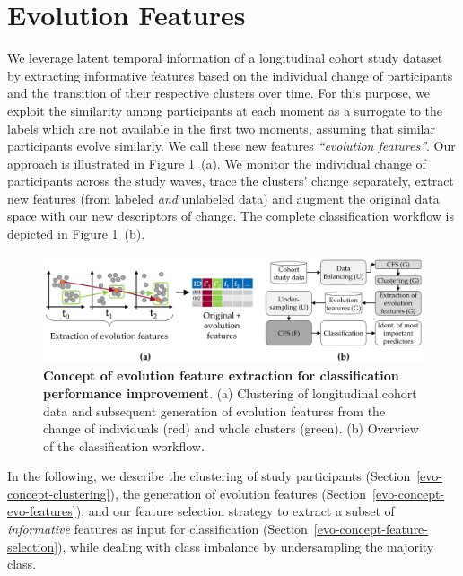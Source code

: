 \documentclass[
  oneside]{book}
\begin{document}
\hypertarget{evo-concept}{%
\section{Evolution Features}\label{evo-concept}}

We leverage latent temporal information of a longitudinal cohort study dataset by extracting informative features based on the individual change of participants and the transition of their respective clusters over time.
For this purpose, we exploit the similarity among participants at each moment as a surrogate to the labels which are not available in the first two moments, assuming that similar participants evolve similarly.
We call these new features \emph{``evolution features''}.
Our approach is illustrated in Figure \ref{fig:06-concept-workflow}~(a).
We monitor the individual change of participants across the study waves, trace the clusters' change separately, extract new features (from labeled \emph{and} unlabeled data) and augment the original data space with our new descriptors of change.
The complete classification workflow is depicted in Figure \ref{fig:06-concept-workflow}~(b).



\begin{figure}[htb]

{\centering \includegraphics[width=1\linewidth]{figures/06-concept-workflow} 

}

\caption{\textbf{Concept of evolution feature extraction for classification performance improvement}. (a) Clustering of longitudinal cohort data and subsequent generation of evolution features from the change of individuals (red) and whole clusters (green). (b) Overview of the classification workflow.}\label{fig:06-concept-workflow}
\end{figure}

In the following, we describe the clustering of study participants (Section~\ref{evo-concept-clustering}), the generation of evolution features (Section~\ref{evo-concept-evo-features}), and our feature selection strategy to extract a subset of \emph{informative} features as input for classification (Section~\ref{evo-concept-feature-selection}), while dealing with class imbalance by undersampling the majority class.
\end{document}
